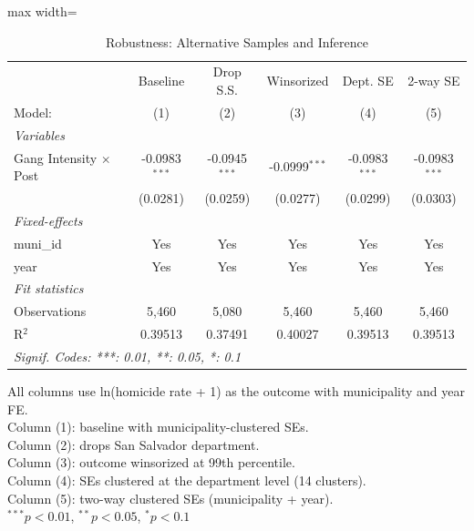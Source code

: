 
\begin{table}[htbp]
   \caption{\label{tab:robustness} Robustness: Alternative Samples and Inference}
   \centering
   \begin{adjustbox}{max width=\textwidth}
   \begin{tabular}{lccccc}
      \tabularnewline \midrule \midrule
                                    & Baseline        & Drop S.S.       & Winsorized      & Dept. SE        & 2-way SE \\   
      Model:                        & (1)             & (2)             & (3)             & (4)             & (5)\\  
      \midrule
      \emph{Variables}\\
      Gang Intensity $\times$ Post  & -0.0983$^{***}$ & -0.0945$^{***}$ & -0.0999$^{***}$ & -0.0983$^{***}$ & -0.0983$^{***}$\\   
                                    & (0.0281)        & (0.0259)        & (0.0277)        & (0.0299)        & (0.0303)\\   
      \midrule
      \emph{Fixed-effects}\\
      muni\_id                      & Yes             & Yes             & Yes             & Yes             & Yes\\  
      year                          & Yes             & Yes             & Yes             & Yes             & Yes\\  
      \midrule
      \emph{Fit statistics}\\
      Observations                  & 5,460           & 5,080           & 5,460           & 5,460           & 5,460\\  
      R$^2$                         & 0.39513         & 0.37491         & 0.40027         & 0.39513         & 0.39513\\  
      \midrule \midrule
      \multicolumn{6}{l}{\emph{Signif. Codes: ***: 0.01, **: 0.05, *: 0.1}}\\
   \end{tabular}
   \end{adjustbox}

   \par \raggedright \small
   All columns use ln(homicide rate + 1) as the outcome with municipality and year FE.\\
   Column (1): baseline with municipality-clustered SEs.\\
   Column (2): drops San Salvador department.\\
   Column (3): outcome winsorized at 99th percentile.\\
   Column (4): SEs clustered at the department level (14 clusters).\\
   Column (5): two-way clustered SEs (municipality + year).\\
   $^{***}p<0.01$, $^{**}p<0.05$, $^{*}p<0.1$
\end{table}


